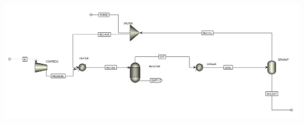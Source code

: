 \documentclass[landscape,a0paper,fontscale=0.285]{baposter} %
\begin{document}
\begin{poster}
{\begin{center}
\includegraphics[width=1\linewidth]{flowsheet}
\end{center}



}





\end{poster}
\end{document}
